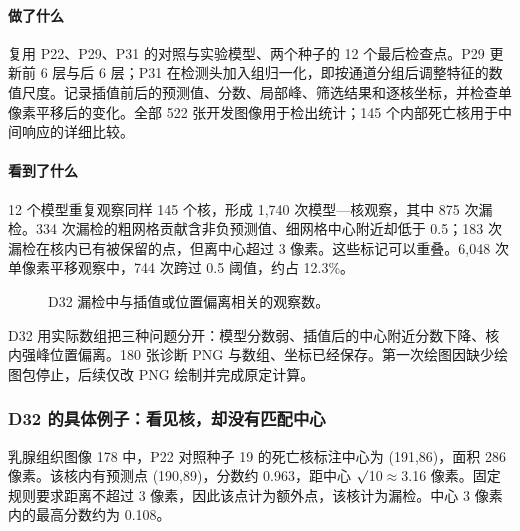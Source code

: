 \documentclass[
  12pt,
  fontset=fandol]{ctexart}
\begin{document}
\paragraph{做了什么}
复用 P22、P29、P31 的对照与实验模型、两个种子的 12 个最后检查点。P29 更新前 6 层与后 6 层；P31 在检测头加入组归一化，即按通道分组后调整特征的数值尺度。记录插值前后的预测值、分数、局部峰、筛选结果和逐核坐标，并检查单像素平移后的变化。全部 522 张开发图像用于检出统计；145 个内部死亡核用于中间响应的详细比较。

\paragraph{看到了什么}
12 个模型重复观察同样 145 个核，形成 1,740 次模型—核观察，其中 875 次漏检。334 次漏检的粗网格贡献含非负预测值、细网格中心附近却低于 0.5；183 次漏检在核内已有被保留的点，但离中心超过 3 像素。这些标记可以重叠。6,048 次单像素平移观察中，744 次跨过 0.5 阈值，约占 12.3\%。

\begin{figure}[H]\centering\caption{D32 漏检中与插值或位置偏离相关的观察数。}\end{figure}
D32 用实际数组把三种问题分开：模型分数弱、插值后的中心附近分数下降、核内强峰位置偏离。180 张诊断 PNG 与数组、坐标已经保存。第一次绘图因缺少绘图包停止，后续仅改 PNG 绘制并完成原定计算。

\subsubsection{D32 的具体例子：看见核，却没有匹配中心}\label{chapter8}
乳腺组织图像 178 中，P22 对照种子 19 的死亡核标注中心为 (191,86)，面积 286 像素。该核内有预测点 (190,89)，分数约 0.963，距中心 \ensuremath{\surd}10\ensuremath{\approx}3.16 像素。固定规则要求距离不超过 3 像素，因此该点计为额外点，该核计为漏检。中心 3 像素内的最高分数约为 0.108。

\begin{center}\end{center}
\end{document}
